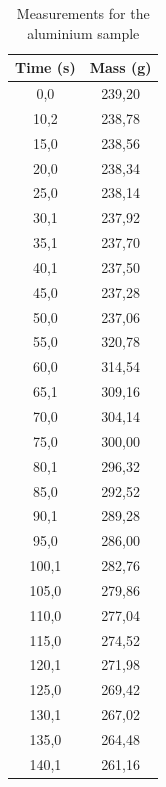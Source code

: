 \documentclass[a4paper, 12pt]{article}
\begin{document}
\newpage
	\begin{table}[hbt!]
		\centering
		\caption{Measurements for the aluminium sample}
		\begin{tabular}{|c | c|}
			\hline
			\textbf{Time (s)} & \textbf{Mass (g)} \\ 
			\hline
		0,0               & 239,20            \\
		10,2              & 238,78            \\
		15,0              & 238,56            \\
		20,0              & 238,34            \\
		25,0              & 238,14            \\
		30,1              & 237,92            \\
		35,1              & 237,70            \\
		40,1              & 237,50            \\
		45,0              & 237,28            \\
		50,0              & 237,06            \\
		\rowcolor[HTML]{FFFF00} 
		55,0              & 320,78            \\
		60,0              & 314,54            \\
		65,1              & 309,16            \\
		70,0              & 304,14            \\
		75,0              & 300,00            \\
		80,1              & 296,32            \\
		85,0              & 292,52            \\
		90,1              & 289,28            \\
		95,0              & 286,00            \\
		100,1             & 282,76            \\
		105,0             & 279,86            \\
		110,0             & 277,04            \\
		115,0             & 274,52            \\
		120,1             & 271,98            \\
		125,0             & 269,42            \\
		130,1             & 267,02            \\
		135,0             & 264,48            \\
		140,1             & 261,16            \\

\end{tabular}
\end{table}
\end{document}
